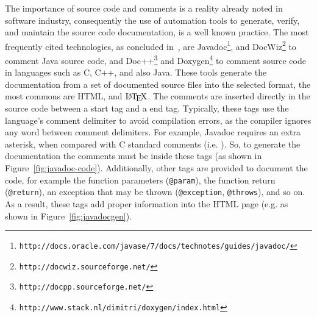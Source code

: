 The importance of source code and comments is a reality already noted in software industry, consequently the use of automation tools to generate, verify, and maintain the source code documentation, is a well known practice. The most frequently cited technologies, as concluded in~\citep{forward2002relevance}, are Javadoc\footnote{\texttt{http://docs.oracle.com/javase/7/docs/technotes/guides/javadoc/}}, and DocWiz\footnote{\texttt{http://docwiz.sourceforge.net/}} to comment Java source code, and Doc++\footnote{\texttt{http://docpp.sourceforge.net/}} and Doxygen\footnote{\texttt{http://www.stack.nl/dimitri/doxygen/index.html}} to comment source code in languages such as C, C++, and also Java. These tools generate the documentation from a set of documented source files into the selected format, the most commons are HTML, and $\mbox{\LaTeX}$. The comments are inserted directly in the source code between a start tag and a end tag. Typically, these tags use the language's comment delimiter to avoid compilation errors, as the compiler ignores any word between comment delimiters. For example, Javadoc requires an extra asterisk, when compared with C standard comments (i.e. \pythoninline{/* */}). So, to generate the documentation the comments must be inside these tags (as shown in Figure~\ref{fig:javadoc-code}). Additionally, other tags are provided to document the code, for example the function parameters (\texttt{@param}), the function return (\texttt{@return}), an exception that may be thrown (\texttt{@exception}, \texttt{@throws}), and so on. As a result, these tags add proper information into the HTML page (e.g. as shown in Figure~\ref{fig:javadocgen}).

